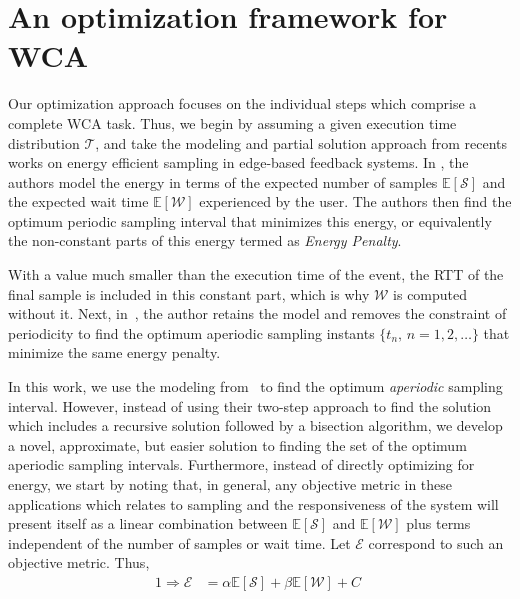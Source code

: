 \section{An optimization framework for \gls{WCA}}\label{sec:optframework}

Our optimization approach focuses on the individual steps which comprise a complete \gls{WCA} task.
Thus, we begin by assuming a given execution time distribution \( \mathcal{T} \), and take the modeling and partial solution approach from recents works on energy efficient sampling in edge-based feedback systems.
In \textcite{moothedath2021energy,moothedath2022energy1}, the authors model the energy in terms of the expected number of samples $\mathbb{E}[\mathcal{S}]$ and the expected wait time $\mathbb{E}[\mathcal{W}]$ experienced by the user.
The authors then find the optimum periodic sampling interval that minimizes this energy, or equivalently the non-constant parts of this energy termed as \textit{Energy Penalty}.

With a value much smaller than the execution time of the event, the \gls{RTT} of the final sample is included in this constant part, which is why $\mathcal{W}$ is computed without it.
Next, in~\cite{moothedath2022energy2}, the author retains the model and removes the constraint of periodicity to find the optimum aperiodic sampling instants $\{t_n,\,n=1,2,\dots\}$ that minimize the same energy penalty.

In this work, we use the modeling from~\cite{moothedath2022energy2} to find the optimum \emph{aperiodic} sampling interval.
However, instead of using their two-step approach to find the solution which includes a recursive solution followed by a bisection algorithm, we develop a novel, approximate, but easier solution to finding the set of the optimum aperiodic sampling intervals.
Furthermore, instead of directly optimizing for energy, we start by noting that, in general, any objective metric in these applications which relates to sampling and the responsiveness of the system will present itself
as a linear combination between $\mathbb{E}[\mathcal{S}]$ and $\mathbb{E}[\mathcal{W}]$ plus terms independent of the number of samples or wait time.
Let $\mathcal{E}$ correspond to such an objective metric.
Thus,
\begin{alignat}{1}
    \Rightarrow\mathcal{E}&=\alpha\mathbb{E}[\mathcal{S}]+\beta\mathbb{E}[\mathcal{W}]+C\;\label{eq:epsilon_terminal}
\end{alignat}

